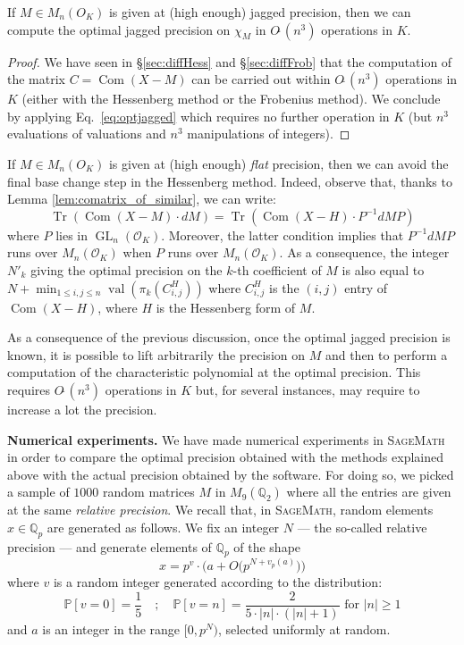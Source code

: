 \documentclass{sig-alternate-05-2015}
\DeclareMathOperator{\GL}{GL}
\DeclareMathOperator{\val}{val}
\DeclareMathOperator{\tr}{Tr}
\DeclareMathOperator{\com}{Com}
\newcommand{\Q}{\mathbb Q}
\newcommand{\OK}{\mathcal{O}_K}
\newcommand{\softO}{O\tilde{~}}
\begin{document}
\begin{prop} \label{prop:optimal_jagged}
If $M \in M_n(O_K)$ is given at (high enough) jagged precision, 
then we can compute the optimal jagged precision on $\chi_M$ in 
$\softO (n^3)$ operations in $K$.
\end{prop}

\begin{proof}
We have seen in \S \ref{sec:diffHess} and \S \ref{sec:diffFrob}
that the computation of the matrix $C = \com(X{-}M)$ can be carried out 
within $\softO(n^3)$ operations in $K$ (either with the Hessenberg 
method or the Frobenius method). We conclude by applying 
Eq.~\eqref{eq:optjagged} which requires no further operation in $K$
(but $n^3$ evaluations of valuations and $n^3$ manipulations of 
integers).
\end{proof}

\begin{rem}
If $M \in M_n(O_K)$ is given at (high enough) \emph{flat} precision, 
then we can avoid the final base change step in the Hessenberg method.
Indeed, observe that, thanks to Lemma \ref{lem:comatrix_of_similar}, 
we can write:
$$\tr(\com (X{-}M) \cdot dM)=\tr(\com (X{-}H)\cdot P^{-1} dM P)$$
where $P$ lies in $\GL_n(\OK)$. Moreover, the latter condition implies
that $P^{-1} dM P$ runs over $M_n(\OK)$ when $P$ runs over $M_n(\OK)$.
As a consequence, the integer $N'_k$ giving the optimal precision on the 
$k$-th coefficient of $M$ is also equal to
$N + \min_{1 \leq i, j\leq n} \val(\pi_k(C^H_{i,j}))$
where $C^H_{i,j}$ is the $(i,j)$ entry of $\com(X{-}H)$,
where $H$ is the Hessenberg form of $M$.
\end{rem}

As a consequence of the previous discussion, once the optimal jagged 
precision is known, it is possible to lift arbitrarily the precision on 
$M$ and then to perform a computation of the characteristic polynomial 
at the optimal precision. This requires $\softO(n^3)$ operations in $K$ 
but, for several instances, may require to increase a lot the precision.

\medskip

\noindent
{\bf Numerical experiments.}
We have made numerical experiments in \textsc{SageMath}~\cite{sage}
in order to compare the optimal precision obtained with the methods
explained above with the actual precision obtained by the software.
For doing so, we picked a sample of $1000$ random matrices $M$ in 
$M_9(\Q_2)$ where all the entries are given at the same \emph{relative
precision}.
We recall that, in \textsc{SageMath}, random elements $x \in \Q_p$ are 
generated as follows. We fix an integer $N$ --- the so-called relative
precision --- and generate elements of $\Q_p$ of the shape
$$x = p^v \cdot \big(a + O\big(p^{N+v_p(a)}\big)\big)$$
where $v$ is a random integer generated according to the distribution:
$$\mathbb P [v = 0] = \frac 1 5 \quad ; \quad
\mathbb P [v = n] = \frac 2 {5\cdot |n| \cdot (|n|+1)} \text{ for }
|n| \geq 1$$
and $a$ is an integer in the range $[0, p^N)$, selected uniformly at random.
\end{document}
